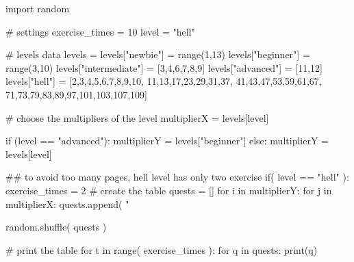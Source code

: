 \documentclass{article}
\begin{document}
\begin{multicols}{6}

\large
{}
\noindent 
\begin{pycode}
import random

# settings 
exercise_times = 10
level = "hell"

# levels data
levels = {}
levels["newbie"]   = range(1,13)
levels["beginner"] = range(3,10)
levels["intermediate"] = [3,4,6,7,8,9]
levels["advanced"]     = [11,12]
levels["hell"] = [2,3,4,5,6,7,8,9,10,
                  11,13,17,23,29,31,37,
                  41,43,47,53,59,61,67,
                  71,73,79,83,89,97,101,103,107,109]

# choose the multipliers of the level
multiplierX = levels[level]

if (level == "advanced"):
    multiplierY = levels["beginner"]
else:
    multiplierY = levels[level]

## to avoid too many pages, hell level has only two exercise
if( level == "hell" ):
    exercise_times = 2  
# create the table
quests = []
for i in multiplierY:
    for j in multiplierX:
        quests.append( "%

random.shuffle( quests )

# print the table
for t in range( exercise_times ):
    for q in quests:
        print(q)

\end{pycode}
\end{multicols}
\end{document}
